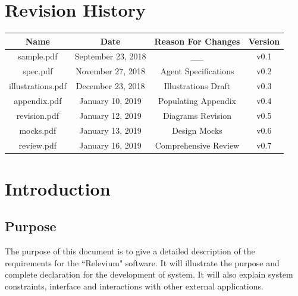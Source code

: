 \documentclass{scrreprt}
\begin{document}
\newpage


\chapter*{Revision History}

\begin{center}
    \begin{tabular}{|c|c|c|c|}
        \hline
	    Name & Date & Reason For Changes & Version\\
        \hline
	   sample.pdf & September 23, 2018 & __ & v0.1\\
        \hline
        spec.pdf & November 27, 2018 & Agent Specifications & v0.2\\
        \hline
        illustrations.pdf & December 23, 2018 & Illustrations Draft & v0.3\\
        \hline
        appendix.pdf & January 10, 2019 & Populating Appendix & v0.4\\
        \hline
        revision.pdf & January 12, 2019 &  Diagrams Revision & v0.5\\
        \hline
        mocks.pdf & January 13, 2019 & Design Mocks & v0.6\\
        \hline
        review.pdf & January 16, 2019 & Comprehensive Review & v0.7\\
        \hline
    \end{tabular}
\end{center}

\chapter{Introduction}

\section{Purpose}

The purpose of this document is to give a detailed description of the requirements for the ``Relevium" software. It will illustrate the purpose and complete declaration for the development of system. It will also explain system constraints, interface and interactions with other external applications.
\end{document}
